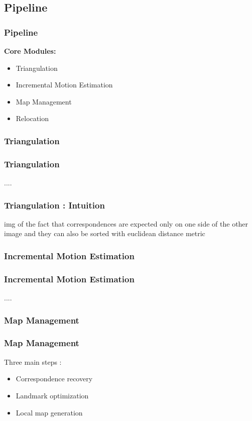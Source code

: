 \documentclass[16pt]{beamer}
\begin{document}
\subsection{Pipeline}
\begin{frame}
  \frametitle{Pipeline}
  \textbf{ Core Modules: } \\
  \begin{itemize}
  \item Triangulation
  \item Incremental Motion Estimation
  \item Map Management 
  \item Relocation
  \end{itemize}

\end{frame}

\subsubsection*{Triangulation}
\begin{frame}
  \frametitle{Triangulation}
  ....
\end{frame}

\begin{frame}
  \frametitle{Triangulation : Intuition}
  img of the fact that correspondences are expected only on one side of the
  other image and they can also be sorted with euclidean distance metric
\end{frame}


\subsubsection*{Incremental Motion Estimation}
\begin{frame}
  \frametitle{Incremental Motion Estimation}
  ....
\end{frame}


\subsubsection*{Map Management}
\begin{frame}
  \frametitle{Map Management}
  Three main steps : 
  \begin{itemize}
  \item Correspondence recovery
  \item Landmark optimization
  \item Local map generation
  \end{itemize}
\end{frame}
\end{document}
